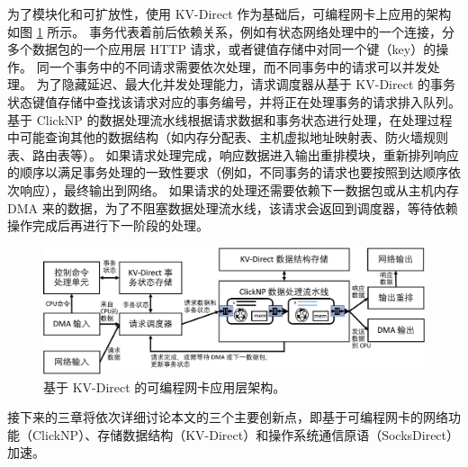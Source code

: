 为了模块化和可扩放性，使用 KV-Direct 作为基础后，可编程网卡上应用的架构如图 \ref{arch:fig:kvdirect_arch} 所示。
事务代表着前后依赖关系，例如有状态网络处理中的一个连接，分多个数据包的一个应用层 HTTP 请求，或者键值存储中对同一个键（key）的操作。
同一个事务中的不同请求需要依次处理，而不同事务中的请求可以并发处理。
为了隐藏延迟、最大化并发处理能力，请求调度器从基于 KV-Direct 的事务状态键值存储中查找该请求对应的事务编号，并将正在处理事务的请求排入队列。
基于 ClickNP 的数据处理流水线根据请求数据和事务状态进行处理，在处理过程中可能查询其他的数据结构（如内存分配表、主机虚拟地址映射表、防火墙规则表、路由表等）。
如果请求处理完成，响应数据进入输出重排模块，重新排列响应的顺序以满足事务处理的一致性要求（例如，不同事务的请求也要按照到达顺序依次响应），最终输出到网络。
如果请求的处理还需要依赖下一数据包或从主机内存 DMA 来的数据，为了不阻塞数据处理流水线，该请求会返回到调度器，等待依赖操作完成后再进行下一阶段的处理。


\begin{figure}[htbp]
	\centering
	\includegraphics[width=1.0\textwidth]{figures/kvdirect_arch.pdf}
	\caption{基于 KV-Direct 的可编程网卡应用层架构。}
	\label{arch:fig:kvdirect_arch}
\end{figure}

接下来的三章将依次详细讨论本文的三个主要创新点，即基于可编程网卡的网络功能（ClickNP）、存储数据结构（KV-Direct）和操作系统通信原语（SocksDirect）加速。
